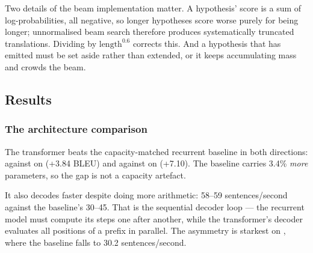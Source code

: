 \documentclass[11pt,a4paper]{article}
\begin{document}
Two details of the beam implementation matter. A hypothesis' score is a sum of
log-probabilities, all negative, so longer hypotheses score worse purely for
being longer; unnormalised beam search therefore produces systematically
truncated translations. Dividing by $\text{length}^{0.6}$ \cite{wu2016}
corrects this. And a hypothesis that has emitted  must be set aside
rather than extended, or it keeps accumulating mass and crowds the beam.


\subsection{Results}

\begin{table}[htbp]
\centering
\caption{Held-out test-set results (\PairsTest{} sentence pairs per direction,
beam search with width 4 and length penalty 0.6). BLEU and chrF2 are
sacreBLEU figures.}
\label{tab:results}
\small

\end{table}



\subsubsection*{The architecture comparison}

The transformer beats the capacity-matched recurrent baseline in both
directions: \BleuBpeScratchEnEs{} against \BleuLstmBaselineEnEs{} on \entos{}
(+3.84 BLEU) and \BleuBpeScratchEsEn{} against \BleuLstmBaselineEsEn{} on
\estoen{} (+7.10). The baseline carries 3.4\% \emph{more} parameters, so the gap
is not a capacity artefact.

It also decodes faster despite doing more arithmetic: 58--59 sentences/second
against the baseline's 30--45. That is the sequential decoder loop --- the
recurrent model must compute its steps one after another, while the
transformer's decoder evaluates all positions of a prefix in parallel. The
asymmetry is starkest on \estoen{}, where the baseline falls to 30.2
sentences/second.
\end{document}
